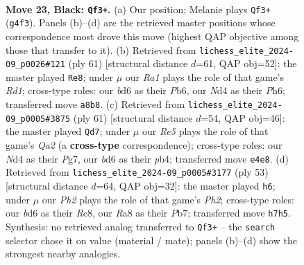 \documentclass[11pt]{article}
\begin{document}
\clearpage

\begin{figure}[p]\centering
\begin{subfigure}{0.46\textwidth}\centering
\resizebox{\linewidth}{!}{%
\newchessgame
\chessboard[
  setfen={r5k1/p4p1p/Q2B2p1/8/3nr1q1/P7/5P1P/R6K b - - 2 23},
  showmover=false,
  pgfstyle=straightmove, color=movearrow, markmove={g4-f3}
]}
\caption{}
\end{subfigure}\hfill
\begin{subfigure}{0.46\textwidth}\centering
\resizebox{\linewidth}{!}{%
\newchessgame
\chessboard[
  setfen={3r3k/p5p1/1p1q1p1p/3P1Q2/8/7P/P4PP1/3R2K1 b - - 2 31},
  showmover=false,
  pgfstyle=straightmove, color=movearrow, markmove={d8-e8}
]}
\caption{}
\end{subfigure}
\\[4pt]
\begin{subfigure}{0.46\textwidth}\centering
\resizebox{\linewidth}{!}{%
\newchessgame
\chessboard[
  setfen={6k1/q3r1p1/p6p/2P1p3/1P2Q3/P7/6PP/5R1K b - - 0 31},
  showmover=false,
  pgfstyle=straightmove, color=movearrow, markmove={a7-d7}
]}
\caption{}
\end{subfigure}\hfill
\begin{subfigure}{0.46\textwidth}\centering
\resizebox{\linewidth}{!}{%
\newchessgame
\chessboard[
  setfen={2r3k1/1pq2ppp/p7/2P5/2Q5/4P2P/P4PP1/3R2K1 b - - 0 27},
  showmover=false,
  pgfstyle=straightmove, color=movearrow, markmove={h7-h6}
]}
\caption{}
\end{subfigure}
\caption{\textbf{Move 23, Black: \texttt{Qf3+}.} (a) Our position; Melanie plays \texttt{Qf3+} (\texttt{g4f3}). Panels (b)--(d) are the retrieved master positions whose correspondence most drove this move (highest QAP objective among those that transfer to it). (b) Retrieved from \texttt{lichess\_elite\_2024-09\_p0026\#121} (ply 61) [structural distance $d$=61, QAP obj=52]: the master played \texttt{Re8}; under $\mu$ our \emph{Ra1} plays the role of that game's \emph{Rd1}; cross-type roles: our \emph{b}d6 as their \emph{P}b6, our \emph{N}d4 as their \emph{P}h6; transferred move \texttt{a8b8}. (c) Retrieved from \texttt{lichess\_elite\_2024-09\_p0005\#3875} (ply 61) [structural distance $d$=54, QAP obj=46]: the master played \texttt{Qd7}; under $\mu$ our \emph{Re5} plays the role of that game's \emph{Qa2} (a \textbf{cross-type} correspondence); cross-type roles: our \emph{N}d4 as their \emph{P}g7, our \emph{b}d6 as their \emph{p}b4; transferred move \texttt{e4e8}. (d) Retrieved from \texttt{lichess\_elite\_2024-09\_p0005\#3177} (ply 53) [structural distance $d$=64, QAP obj=32]: the master played \texttt{h6}; under $\mu$ our \emph{Ph2} plays the role of that game's \emph{Ph2}; cross-type roles: our \emph{b}d6 as their \emph{R}c8, our \emph{R}a8 as their \emph{P}b7; transferred move \texttt{h7h5}. Synthesis: no retrieved analog transferred to \texttt{Qf3+} -- the \texttt{search} selector chose it on value (material / mate); panels (b)--(d) show the strongest nearby analogies.}
\label{fig:thought-m45}
\end{figure}
\end{document}
